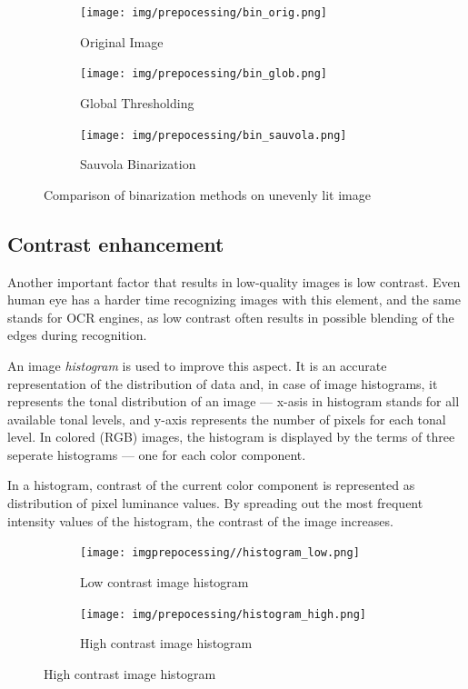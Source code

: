 \begin{figure}[H]
\hspace*{\fill} %
\begin{subfigure}{0.31\textwidth}
\texttt{[image: img/prepocessing/bin\_orig.png]}
\caption{Original Image} \label{fig:1a}
\end{subfigure}
\hspace*{\fill} %
\begin{subfigure}{0.31\textwidth}
\texttt{[image: img/prepocessing/bin\_glob.png]}
\caption{Global Thresholding} \label{fig:1b}
\end{subfigure}
\hspace*{\fill} %
\begin{subfigure}{0.31\textwidth}
\texttt{[image: img/prepocessing/bin\_sauvola.png]}
\caption{Sauvola Binarization}\label{fig:1c}
\end{subfigure}
\caption{Comparison of binarization methods on unevenly lit image} \label{fig:1}
\end{figure}

\subsection{Contrast enhancement}

Another important factor that results in low-quality images is low contrast. Even human eye has a harder time recognizing images 
with this element, and the same stands for OCR engines, as low contrast often results in possible blending of the edges during recognition.

An image \emph{histogram} is used to improve this aspect. It is an accurate representation of the distribution of data and, in case of image histograms, it represents the tonal distribution of an image --- x-asis in histogram stands for all available tonal levels, and y-axis represents the number of pixels for each tonal level. In colored (RGB) images, the histogram is displayed by the terms of three seperate histograms --- one for each color component.

In a histogram, contrast of the current color component is represented as distribution of pixel luminance values. By spreading out the most frequent intensity values of the histogram, the contrast of the image increases.

\begin{figure}[H]
\centering
\hspace*{\fill} %
\begin{subfigure}{0.31\textwidth}
\texttt{[image: imgprepocessing//histogram\_low.png]}
\caption{Low contrast image histogram} \label{fig:1a}
\end{subfigure}
\hspace*{\fill} %
\begin{subfigure}{0.31\textwidth}
\texttt{[image: img/prepocessing/histogram\_high.png]}
\caption{High contrast image histogram} \label{fig:1b}
\end{subfigure}
\end{figure}

